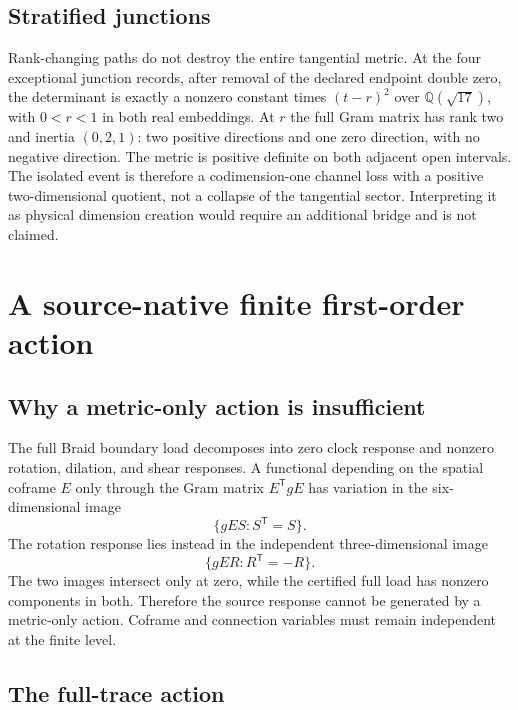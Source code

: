 \documentclass[11pt]{article}
\theoremstyle{definition}
\theoremstyle{remark}
\begin{document}
\subsection{Stratified junctions}

Rank-changing paths do not destroy the entire tangential metric. At the four exceptional junction records, after removal of the declared endpoint double zero, the determinant is exactly a nonzero constant times $(t-r)^2$ over $\mathbb Q(\sqrt{17})$, with $0<r<1$ in both real embeddings. At $r$ the full Gram matrix has rank two and inertia $(0,2,1)$: two positive directions and one zero direction, with no negative direction. The metric is positive definite on both adjacent open intervals. The isolated event is therefore a codimension-one channel loss with a positive two-dimensional quotient, not a collapse of the tangential sector. Interpreting it as physical dimension creation would require an additional bridge and is not claimed.

\section{A source-native finite first-order action}

\subsection{Why a metric-only action is insufficient}

The full Braid boundary load decomposes into zero clock response and nonzero rotation, dilation, and shear responses. A functional depending on the spatial coframe $E$ only through the Gram matrix $E^{\mathsf T}gE$ has variation in the six-dimensional image
\begin{equation}\label{eq:metricimage}
 \{gES:S^{\mathsf T}=S\}.
\end{equation}
The rotation response lies instead in the independent three-dimensional image
\begin{equation}\label{eq:rotationimage}
 \{gER:R^{\mathsf T}=-R\}.
\end{equation}
The two images intersect only at zero, while the certified full load has nonzero components in both. Therefore the source response cannot be generated by a metric-only action. Coframe and connection variables must remain independent at the finite level.

\subsection{The full-trace action}
\end{document}
